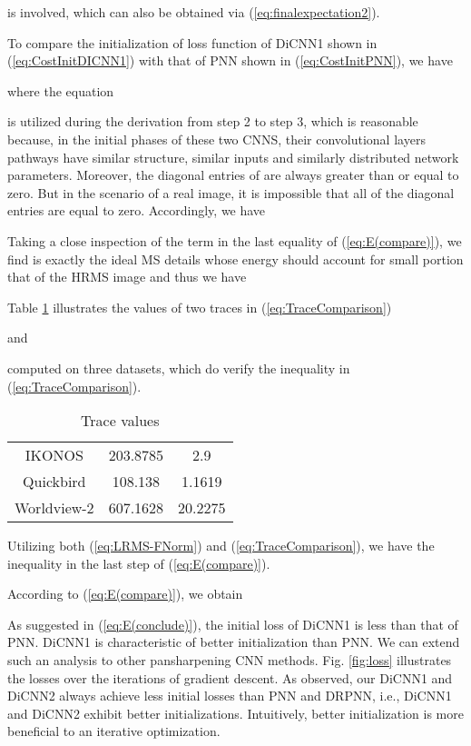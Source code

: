 \documentclass[journal]{IEEEtran}
\begin{document}
is involved, which can also be obtained via (\ref{eq:finalexpectation2}).

To compare the initialization of loss function of DiCNN1 shown in (\ref{eq:CostInitDICNN1}) with that of PNN shown in (\ref{eq:CostInitPNN}), we have

where the equation

is utilized during the derivation from step 2 to step 3, which is reasonable because, in the initial phases of these two CNNS, their convolutional layers pathways have similar structure, similar inputs and similarly distributed network parameters.
Moreover,
the diagonal entries of  are always greater than or equal to zero. But in the scenario of a real image, it is impossible that all of the diagonal entries are equal to zero. Accordingly, we have

Taking a close inspection of the term  in the last equality of (\ref{eq:E(compare)}), we find  is exactly the ideal MS details whose energy should account for small portion that of the HRMS image and thus we have

Table \ref{table:TraceComparison} illustrates the values of two traces in  (\ref{eq:TraceComparison})

and

computed on three datasets, which do verify the inequality in (\ref{eq:TraceComparison}).
\begin{table}[H]
\caption{Trace values}
\centering
\begin{tabular}{c|cc}
\hline
{}&   &  \\
\hline
IKONOS& 203.8785 &2.9\\
\hline
Quickbird& 108.138 &1.1619\\
\hline
Worldview-2 &607.1628 &20.2275\\
\hline
\end{tabular}
\label{table:TraceComparison}
\end{table}
Utilizing both (\ref{eq:LRMS-FNorm}) and (\ref{eq:TraceComparison}), we have the inequality in the last step of (\ref{eq:E(compare)}).

According to (\ref{eq:E(compare)}), we obtain


As suggested in (\ref{eq:E(conclude)}), the initial loss of DiCNN1 is less than that of PNN. DiCNN1 is characteristic of better initialization than PNN. We can extend such an analysis to other pansharpening CNN methods. Fig. \ref{fig:loss} illustrates the losses over the iterations of gradient descent. As observed, our DiCNN1 and DiCNN2 always achieve less initial losses than PNN and DRPNN, i.e., DiCNN1 and DiCNN2 exhibit better initializations. Intuitively, better initialization is more beneficial to an iterative optimization.
\end{document}
